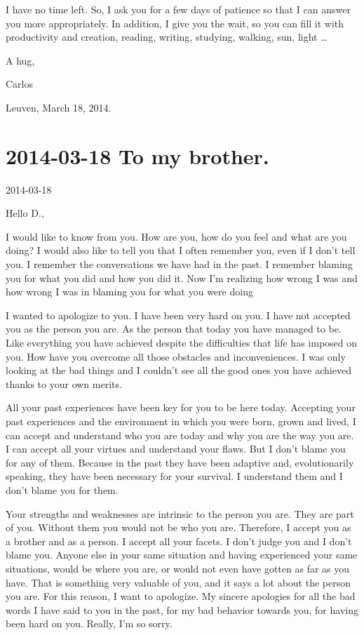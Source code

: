 \documentclass[]{book}
\begin{document}
I have no time left. So, I ask you for a few days of patience so that I can answer you more appropriately. In addition, I give you the wait, so you can fill it with productivity and creation, reading, writing, studying, walking, sun, light \ldots{}

A hug,

Carlos

Leuven, March 18, 2014.

\hypertarget{tobrother20140318}{%
\section*{2014-03-18 To my brother.}\label{tobrother20140318}}

2014-03-18

Hello D.,

I would like to know from you. How are you, how do you feel and what are you doing? I would also like to tell you that I often remember you, even if I don't tell you. I remember the conversations we have had in the past. I remember blaming you for what you did and how you did it. Now I'm realizing how wrong I was and how wrong I was in blaming you for what you were doing

I wanted to apologize to you. I have been very hard on you. I have not accepted you as the person you are. As the person that today you have managed to be. Like everything you have achieved despite the difficulties that life has imposed on you. How have you overcome all those obstacles and inconveniences. I was only looking at the bad things and I couldn't see all the good ones you have achieved thanks to your own merits.

All your past experiences have been key for you to be here today. Accepting your past experiences and the environment in which you were born, grown and lived, I can accept and understand who you are today and why you are the way you are. I can accept all your virtues and understand your flaws. But I don't blame you for any of them. Because in the past they have been adaptive and, evolutionarily speaking, they have been necessary for your survival. I understand them and I don't blame you for them.

Your strengths and weaknesses are intrinsic to the person you are. They are part of you. Without them you would not be who you are. Therefore, I accept you as a brother and as a person. I accept all your facets. I don't judge you and I don't blame you. Anyone else in your same situation and having experienced your same situations, would be where you are, or would not even have gotten as far as you have. That is something very valuable of you, and it says a lot about the person you are. For this reason, I want to apologize. My sincere apologies for all the bad words I have said to you in the past, for my bad behavior towards you, for having been hard on you. Really, I'm so sorry.
\end{document}
